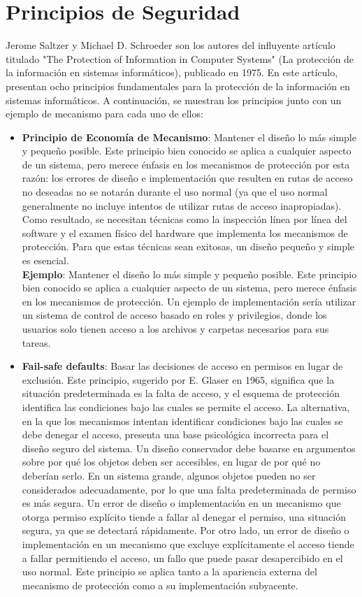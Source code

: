\section{Principios de Seguridad}
Jerome Saltzer y Michael D. Schroeder son los autores del influyente artículo titulado "The Protection of Information in Computer Systems" (La protección de la información en sistemas informáticos), publicado en 1975. En este artículo, presentan ocho principios fundamentales para la protección de la información en sistemas informáticos. A continuación, se muestran los principios junto con un ejemplo de mecanismo para cada uno de ellos:\\
\begin{itemize}
    \item  \textbf{Principio de Economía de Mecanismo}: Mantener el diseño lo más simple y pequeño posible. Este principio bien conocido se aplica a cualquier aspecto de un sistema, pero merece énfasis en los mecanismos de protección por esta razón: los errores de diseño e implementación que resulten en rutas de acceso no deseadas no se notarán durante el uso normal (ya que el uso normal generalmente no incluye intentos de utilizar rutas de acceso inapropiadas). Como resultado, se necesitan técnicas como la inspección línea por línea del software y el examen físico del hardware que implementa los mecanismos de protección. Para que estas técnicas sean exitosas, un diseño pequeño y simple es esencial.\\ \textbf{Ejemplo}: Mantener el diseño lo más simple y pequeño posible. Este principio bien conocido se aplica a cualquier aspecto de un sistema, pero merece énfasis en los mecanismos de protección. Un ejemplo de implementación sería utilizar un sistema de control de acceso basado en roles y privilegios, donde los usuarios solo tienen acceso a los archivos y carpetas necesarios para sus tareas.

\item  \textbf{Fail-safe defaults}: Basar las decisiones de acceso en permisos en lugar de exclusión. Este principio, sugerido por E. Glaser en 1965, significa que la situación predeterminada es la falta de acceso, y el esquema de protección identifica las condiciones bajo las cuales se permite el acceso. La alternativa, en la que los mecanismos intentan identificar condiciones bajo las cuales se debe denegar el acceso, presenta una base psicológica incorrecta para el diseño seguro del sistema. Un diseño conservador debe basarse en argumentos sobre por qué los objetos deben ser accesibles, en lugar de por qué no deberían serlo. En un sistema grande, algunos objetos pueden no ser considerados adecuadamente, por lo que una falta predeterminada de permiso es más segura. Un error de diseño o implementación en un mecanismo que otorga permiso explícito tiende a fallar al denegar el permiso, una situación segura, ya que se detectará rápidamente. Por otro lado, un error de diseño o implementación en un mecanismo que excluye explícitamente el acceso tiende a fallar permitiendo el acceso, un fallo que puede pasar desapercibido en el uso normal. Este principio se aplica tanto a la apariencia externa del mecanismo de protección como a su implementación subyacente.


\end{itemize}
